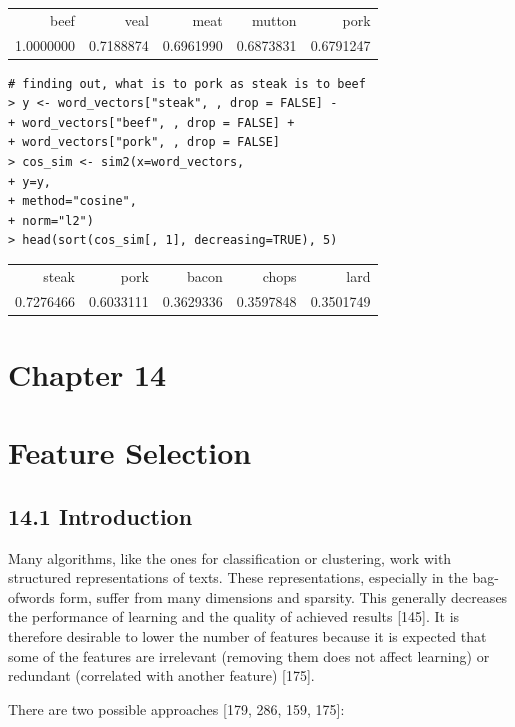 \documentclass[10pt]{book}
\begin{document}
\begin{center}
\begin{tabular}{rrrrr}
beef & veal & meat & mutton & pork \\
1.0000000 & 0.7188874 & 0.6961990 & 0.6873831 & 0.6791247 \\
\end{tabular}
\end{center}

\begin{verbatim}
# finding out, what is to pork as steak is to beef
> y <- word_vectors["steak", , drop = FALSE] -
+ word_vectors["beef", , drop = FALSE] +
+ word_vectors["pork", , drop = FALSE]
> cos_sim <- sim2(x=word_vectors,
+ y=y,
+ method="cosine",
+ norm="l2")
> head(sort(cos_sim[, 1], decreasing=TRUE), 5)
\end{verbatim}

\begin{center}
\begin{tabular}{rrrrr}
steak & pork & bacon & chops & lard \\
0.7276466 & 0.6033111 & 0.3629336 & 0.3597848 & 0.3501749 \\
\end{tabular}
\end{center}

\section*{Chapter 14}
\section*{Feature Selection}
\subsection*{14.1 Introduction}
Many algorithms, like the ones for classification or clustering, work with structured representations of texts. These representations, especially in the bag-ofwords form, suffer from many dimensions and sparsity. This generally decreases the performance of learning and the quality of achieved results [145]. It is therefore desirable to lower the number of features because it is expected that some of the features are irrelevant (removing them does not affect learning) or redundant (correlated with another feature) [175].

There are two possible approaches [179, 286, 159, 175]:
\end{document}

